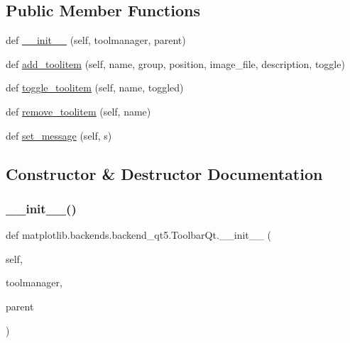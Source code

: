 \subsection*{Public Member Functions}
\begin{DoxyCompactItemize}
\item 
def \hyperlink{classmatplotlib_1_1backends_1_1backend__qt5_1_1ToolbarQt_ad940ef7fd368762dfb966a216fa567bf}{\+\_\+\+\_\+init\+\_\+\+\_\+} (self, toolmanager, parent)
\item 
def \hyperlink{classmatplotlib_1_1backends_1_1backend__qt5_1_1ToolbarQt_a6a1581e81f21699e0b9afe8af4cbf802}{add\+\_\+toolitem} (self, name, group, position, image\+\_\+file, description, toggle)
\item 
def \hyperlink{classmatplotlib_1_1backends_1_1backend__qt5_1_1ToolbarQt_ac8005b9317673dda9ebf1387e0fcd342}{toggle\+\_\+toolitem} (self, name, toggled)
\item 
def \hyperlink{classmatplotlib_1_1backends_1_1backend__qt5_1_1ToolbarQt_ae1301f08015be0497e7c22d35b686da1}{remove\+\_\+toolitem} (self, name)
\item 
def \hyperlink{classmatplotlib_1_1backends_1_1backend__qt5_1_1ToolbarQt_a1b31115c936e55c3e0c724207ebb0ae7}{set\+\_\+message} (self, s)
\end{DoxyCompactItemize}


\subsection{Constructor \& Destructor Documentation}
\mbox{\label{classmatplotlib_1_1backends_1_1backend__qt5_1_1ToolbarQt_ad940ef7fd368762dfb966a216fa567bf}} 
\subsubsection{\texorpdfstring{\+\_\+\+\_\+init\+\_\+\+\_\+()}{\_\_init\_\_()}}
{\footnotesize\ttfamily def matplotlib.\+backends.\+backend\+\_\+qt5.\+Toolbar\+Qt.\+\_\+\+\_\+init\+\_\+\+\_\+ (\begin{DoxyParamCaption}\item[{}]{self,  }\item[{}]{toolmanager,  }\item[{}]{parent }\end{DoxyParamCaption})}




